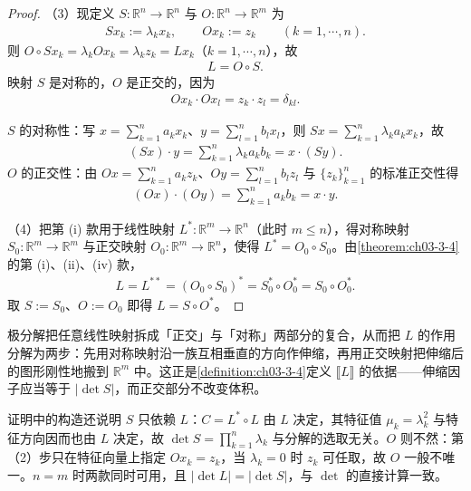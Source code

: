 \documentclass[../../main.tex]{subfiles}%
\begin{document}
\begin{proof}
（3）现定义 $S:\mathbb{R}^n\to\mathbb{R}^n$ 与 $O:\mathbb{R}^n\to\mathbb{R}^m$ 为
\begin{align*}
Sx_k:=\lambda_kx_k,\qquad Ox_k:=z_k\qquad(k=1,\cdots,n).
\end{align*}
则 $O\circ Sx_k=\lambda_kOx_k=\lambda_kz_k=Lx_k$（$k=1,\cdots,n$），故
\begin{align*}
L=O\circ S.
\end{align*}
映射 $S$ 是对称的，$O$ 是正交的，因为
\begin{align*}
Ox_k\cdot Ox_l=z_k\cdot z_l=\delta_{kl}.
\end{align*}

$S$ 的对称性：写 $x=\sum_{k=1}^na_kx_k$、$y=\sum_{l=1}^nb_lx_l$，则 $Sx=\sum_{k=1}^n\lambda_ka_kx_k$，故
\begin{align*}
(Sx)\cdot y=\sum_{k=1}^n\lambda_ka_kb_k=x\cdot(Sy).
\end{align*}
$O$ 的正交性：由 $Ox=\sum_{k=1}^na_kz_k$、$Oy=\sum_{l=1}^nb_lz_l$ 与 $\{z_k\}_{k=1}^n$ 的标准正交性得
\begin{align*}
(Ox)\cdot(Oy)=\sum_{k=1}^na_kb_k=x\cdot y.
\end{align*}

（4）把第 (i) 款用于线性映射 $L^*:\mathbb{R}^m\to\mathbb{R}^n$（此时 $m\leqslant n$），得对称映射 $S_0:\mathbb{R}^m\to\mathbb{R}^m$ 与正交映射 $O_0:\mathbb{R}^m\to\mathbb{R}^n$，使得 $L^*=O_0\circ S_0$。由\cref{theorem:ch03-3-4}的第 (i)、(ii)、(iv) 款，%
\begin{align*}
L=L^{**}=(O_0\circ S_0)^*=S_0^*\circ O_0^*=S_0\circ O_0^*.
\end{align*}
取 $S:=S_0$、$O:=O_0$ 即得 $L=S\circ O^*$。
\end{proof}

\begin{remark}\label{remark:ch03-thm-3-5-动机}
极分解把任意线性映射拆成「正交」与「对称」两部分的复合，从而把 $L$ 的作用分解为两步：先用对称映射沿一族互相垂直的方向作伸缩，再用正交映射把伸缩后的图形刚性地搬到 $\mathbb{R}^m$ 中。这正是\cref{definition:ch03-3-4}定义 $\llbracket L\rrbracket$ 的依据——伸缩因子应当等于 $\lvert\det S\rvert$，而正交部分不改变体积。%

证明中的构造还说明 $S$ 只依赖 $L$：$C=L^*\circ L$ 由 $L$ 决定，其特征值 $\mu_k=\lambda_k^2$ 与特征方向因而也由 $L$ 决定，故 $\det S=\prod_{k=1}^n\lambda_k$ 与分解的选取无关。$O$ 则不然：第（2）步只在特征向量上指定 $Ox_k=z_k$，当 $\lambda_k=0$ 时 $z_k$ 可任取，故 $O$ 一般不唯一。$n=m$ 时两款同时可用，且 $\lvert\det L\rvert=\lvert\det S\rvert$，与 $\det$ 的直接计算一致。
\end{remark}
\end{document}
